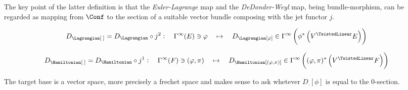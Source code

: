 \documentclass[a4paper,12pt]{scrartcl}  %
\begin{document}
The key point of the latter definition is that the \emph{Euler-Lagrange} map and the \emph{DeDonder-Weyl} map, being bundle-morphism, can be regarded as mapping from $\Conf$ to the section of a suitable vector bundle composing with the jet functor $j$.

\begin{equation}
	D_\Lagrangian[\; ] = D_\Lagrangian \circ j^2 : \quad \Gamma^\infty(E) \ni \varphi \quad \mapsto \quad D_\Lagrangian[ \varphi ] \in \Gamma^\infty \left( \phi^\ast \left(V^\TwistedLinear E \right)\right)
\end{equation}

\begin{equation}
	D_\Hamiltonian[\; ] = D_\Hamiltonian \circ j^1 : \quad \Gamma^\infty(F) \ni (\varphi,\pi) \quad \mapsto \quad D_\Hamiltonian[ (\varphi,\pi) ] \in \Gamma^\infty \left( (\varphi,\pi)^\ast \left(V^\TwistedLinear F \right)\right)
\end{equation}

The target base is a vector space, more precisely a frechet space \cite[Cap.2]{Ban} and makes sense to ask whetever $D_\cdot [\phi]$ is equal to the 0-section.
\end{document}
